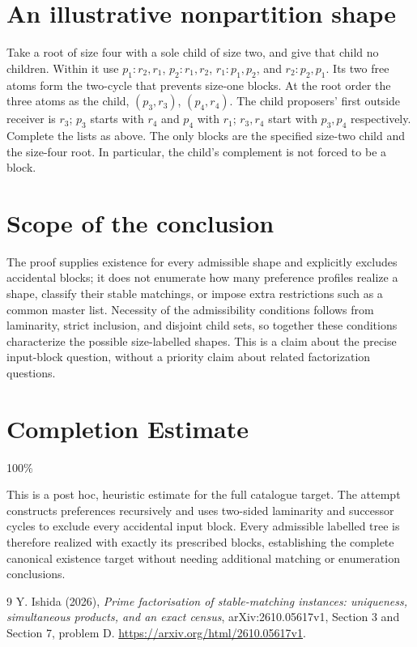 \documentclass[11pt]{article}
\theoremstyle{definition}
\begin{document}
\section*{An illustrative nonpartition shape}
Take a root of size four with a sole child of size two, and give that
child no children. Within it use $p_1:r_2,r_1$,
$p_2:r_1,r_2$, $r_1:p_1,p_2$, and $r_2:p_2,p_1$.
Its two free atoms form the two-cycle that prevents size-one blocks.
At the root order the three atoms as the child, $(p_3,r_3)$,
$(p_4,r_4)$. The child proposers' first outside receiver is $r_3$;
$p_3$ starts with $r_4$ and $p_4$ with $r_1$; $r_3,r_4$ start with
$p_3,p_4$ respectively. Complete the lists as above. The only blocks
are the specified size-two child and the size-four root. In particular,
the child's complement is not forced to be a block.

\section*{Scope of the conclusion}
The proof supplies existence for every admissible shape and explicitly
excludes accidental blocks; it does not enumerate how many preference
profiles realize a shape, classify their stable matchings, or impose
extra restrictions such as a common master list. Necessity of the
admissibility conditions follows from laminarity, strict inclusion,
and disjoint child sets, so together these conditions characterize
the possible size-labelled shapes. This is a claim about the precise
input-block question, without a priority claim about related
factorization questions.

\section{Completion Estimate}
100\%

This is a post hoc, heuristic estimate for the full catalogue target.
The attempt constructs preferences recursively and uses two-sided laminarity and successor cycles to exclude every accidental input block. Every admissible labelled tree is therefore realized with exactly its prescribed blocks, establishing the complete canonical existence target without needing additional matching or enumeration conclusions.

\begin{thebibliography}{9}
 Y. Ishida (2026), \emph{Prime factorisation of
stable-matching instances: uniqueness, simultaneous products, and an
exact census}, arXiv:2610.05617v1, Section 3 and Section 7, problem D.
\url{https://arxiv.org/html/2610.05617v1}.
\end{thebibliography}
\end{document}
